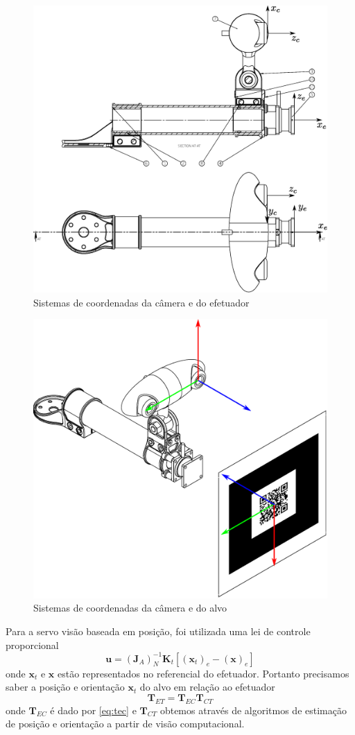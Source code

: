 \begin{figure}[!h]
  \centering
  \includegraphics[width=0.8\linewidth]{./img/effector2}
  \caption{Sistemas de coordenadas da câmera e do efetuador}
  \label{fig:camera_ref}
\end{figure}

\begin{figure}[!h]
  \centering
  \includegraphics[width=0.8\linewidth]{./img/camera_target}
  \caption{Sistemas de coordenadas da câmera e do alvo}
  \label{fig:camera_target}
\end{figure}


Para a servo visão baseada em posição, foi utilizada uma lei de controle proporcional
\begin{equation} \label{eq:lei_posicao}
\bm{u} = (\bm{J}_{A})_N^{-1} \bm{K}_t [(\bm{x}_t)_e - (\bm{x})_e]
\end{equation}
onde $\bm{x}_t$ e $\bm{x}$ estão representados no referencial do efetuador. Portanto precisamos saber a posição e orientação $\bm{x}_t$ do alvo em relação ao efetuador
\begin{equation}
\bm{T}_{ET} = \bm{T}_{EC} \bm{T}_{CT}
\end{equation}
onde $\bm{T}_{EC}$ é dado por \eqref{eq:tec} e $\bm{T}_{CT}$ obtemos através de algoritmos de estimação de posição e orientação a partir de visão computacional. 

